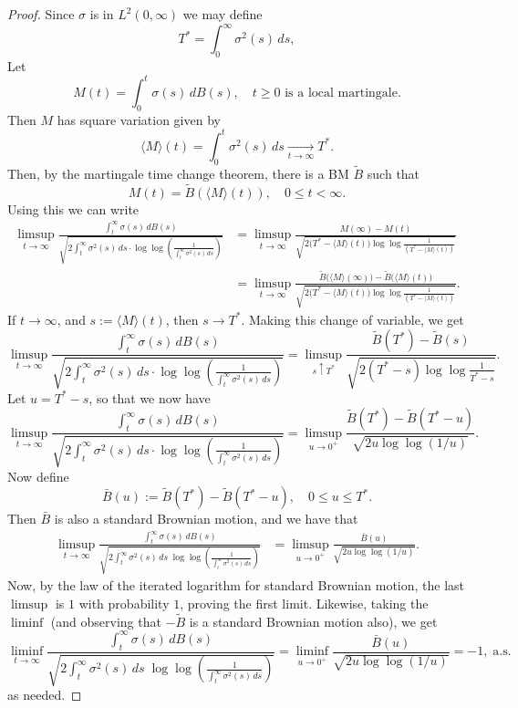\documentclass[a4paper,10pt,reqno]{amsart}
\numberwithin{equation}{section}
\theoremstyle{definition}
\theoremstyle{remark}
\DeclareMathOperator{\1}{\mathbbm 1}
\begin{document}
	\begin{proof}
		Since $\sigma$ is in $L^2(0,\infty)$ we may define 
		\[
		T^* = \int_0^\infty \sigma^2(s) \, ds, 
		\]
		Let
		\[
		M(t) = \int_0^t \sigma(s) \, dB(s), \quad t \geq 0 \text{ is a local martingale.}
		\]
		Then $M$ has square variation given by
		\[
		\langle M \rangle (t) = \int_0^t \sigma^2(s) \, ds \xrightarrow[t \to \infty]{} T^*.
		\]
		Then, by the martingale time change theorem, there is a BM $\widetilde{B}$ such that
		\[
		M(t) = \widetilde{B}(\langle M \rangle (t)), \quad 0 \leq t < \infty.
		\]
		Using this we can write 
		\begin{align*}
			\limsup_{t \to \infty} \frac{\int_t^\infty \sigma(s) \, dB(s)}{\sqrt{2 \int_t^\infty \sigma^2(s) \, ds \cdot \log \log \left( \frac{1}{\int_t^\infty \sigma^2(s) \, ds} \right) }}
			&= \limsup_{t \to \infty} 
			\frac{M(\infty) - M(t)}
			{\sqrt{2\bigl(T^* - \langle M \rangle (t)\bigr)\log\log\frac{1}{(T^* - \langle M \rangle (t))}}}\\
			&= \limsup_{t \to \infty} 
			\frac{\tilde{B}\bigl(\langle M \rangle (\infty)\bigr) - \tilde{B}\bigl(\langle M \rangle (t)\bigr)}
			{\sqrt{2\bigl(T^* - \langle M \rangle (t)\bigr)\log\log \frac{1}{(T^* - \langle M \rangle (t))}}}.
		\end{align*}
		If $t \to \infty$, and $s := \langle M \rangle (t)$, then $s \to T^*$. Making this change of variable, we get  
		\[
		\limsup_{t \to \infty} \frac{\int_t^\infty \sigma(s) \, dB(s)}{\sqrt{2 \int_t^\infty \sigma^2(s) \, ds \cdot \log \log \left( \frac{1}{\int_t^\infty \sigma^2(s) \, ds} \right) }}	
		= \limsup_{s \uparrow T^*} 
		\frac{\tilde{B}(T^*) - \tilde{B}(s)}
		{\sqrt{2(T^* - s)\log\log \frac{1}{T^* - s}}}.
		\]
		Let $u = T^* - s$, so that we now have
		\[
		\limsup_{t \to \infty} \frac{\int_t^\infty \sigma(s) \, dB(s)}{\sqrt{2 \int_t^\infty \sigma^2(s) \, ds \cdot \log \log \left( \frac{1}{\int_t^\infty \sigma^2(s) \, ds} \right) }}
		= \limsup_{u \to 0^+} 
		\frac{\tilde{B}(T^*) - \tilde{B}(T^* - u)}
		{\sqrt{2u \log\log (1/u)}}.
		\]
		Now define 
		\[
		\bar{B}(u) := \tilde{B}(T^*) - \tilde{B}(T^* - u), 
		\quad 0 \leq u \leq T^*.
		\]
		Then $\bar{B}$ is also a standard Brownian motion, and we have that
		\begin{align*}
			\limsup_{t \to \infty}
			\frac{\int_t^\infty \sigma(s)\, dB(s)}
			{\sqrt{2 \int_t^\infty \sigma^2(s)\, ds \; \log\log \left( \frac{1}{\int_t^\infty \sigma^2(s) \, ds} \right) }}
			&= \limsup_{u \to 0^+}
			\frac{\bar{B}(u)}
			{\sqrt{2u \log\log (1/u)}}.
		\end{align*}
		Now, by the law of the iterated logarithm for standard Brownian motion, the last $\limsup$ is $1$ with probability $1$, proving the first limit. 
		Likewise, taking the $\liminf$ (and observing that $-\tilde{B}$ is a standard Brownian motion also), we get
		\[
		\liminf_{t \to \infty}
		\frac{\int_t^\infty \sigma(s)\, dB(s)}
		{\sqrt{2 \int_t^\infty \sigma^2(s)\, ds \;\log\log \left( \frac{1}{\int_t^\infty \sigma^2(s) \, ds} \right)}}
		= \liminf_{u \to 0^+} \frac{\bar{B}(u)}{\sqrt{2u \log\log (1/u)}}
		= -1, \; \text{a.s.}
		\]
		as needed.
	\end{proof}
\end{document}

